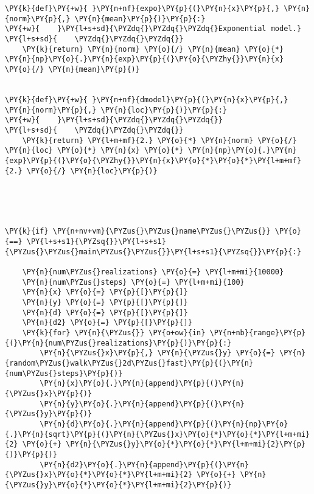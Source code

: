 \begin{Verbatim}[label=\makebox{\href{https://github.com/unipi-physics-labs/lab1-sheets/tree/main/snippy/random_walk.py}{https://github.com/.../random\_walk.py}},commandchars=\\\{\}]
\PY{k}{def}\PY{+w}{ }\PY{n+nf}{expo}\PY{p}{(}\PY{n}{x}\PY{p}{,} \PY{n}{norm}\PY{p}{,} \PY{n}{mean}\PY{p}{)}\PY{p}{:}
\PY{+w}{    }\PY{l+s+sd}{\PYZdq{}\PYZdq{}\PYZdq{}Exponential model.}
\PY{l+s+sd}{    \PYZdq{}\PYZdq{}\PYZdq{}}
    \PY{k}{return} \PY{n}{norm} \PY{o}{/} \PY{n}{mean} \PY{o}{*} \PY{n}{np}\PY{o}{.}\PY{n}{exp}\PY{p}{(}\PY{o}{\PYZhy{}}\PY{n}{x} \PY{o}{/} \PY{n}{mean}\PY{p}{)}


\PY{k}{def}\PY{+w}{ }\PY{n+nf}{dmodel}\PY{p}{(}\PY{n}{x}\PY{p}{,} \PY{n}{norm}\PY{p}{,} \PY{n}{loc}\PY{p}{)}\PY{p}{:}
\PY{+w}{    }\PY{l+s+sd}{\PYZdq{}\PYZdq{}\PYZdq{}}
\PY{l+s+sd}{    \PYZdq{}\PYZdq{}\PYZdq{}}
    \PY{k}{return} \PY{l+m+mf}{2.} \PY{o}{*} \PY{n}{norm} \PY{o}{/} \PY{n}{loc} \PY{o}{*} \PY{n}{x} \PY{o}{*} \PY{n}{np}\PY{o}{.}\PY{n}{exp}\PY{p}{(}\PY{o}{\PYZhy{}}\PY{n}{x}\PY{o}{*}\PY{o}{*}\PY{l+m+mf}{2.} \PY{o}{/} \PY{n}{loc}\PY{p}{)}





\PY{k}{if} \PY{n+nv+vm}{\PYZus{}\PYZus{}name\PYZus{}\PYZus{}} \PY{o}{==} \PY{l+s+s1}{\PYZsq{}}\PY{l+s+s1}{\PYZus{}\PYZus{}main\PYZus{}\PYZus{}}\PY{l+s+s1}{\PYZsq{}}\PY{p}{:}

    \PY{n}{num\PYZus{}realizations} \PY{o}{=} \PY{l+m+mi}{10000}
    \PY{n}{num\PYZus{}steps} \PY{o}{=} \PY{l+m+mi}{100}
    \PY{n}{x} \PY{o}{=} \PY{p}{[}\PY{p}{]}
    \PY{n}{y} \PY{o}{=} \PY{p}{[}\PY{p}{]}
    \PY{n}{d} \PY{o}{=} \PY{p}{[}\PY{p}{]}
    \PY{n}{d2} \PY{o}{=} \PY{p}{[}\PY{p}{]}
    \PY{k}{for} \PY{n}{\PYZus{}} \PY{o+ow}{in} \PY{n+nb}{range}\PY{p}{(}\PY{n}{num\PYZus{}realizations}\PY{p}{)}\PY{p}{:}
        \PY{n}{\PYZus{}x}\PY{p}{,} \PY{n}{\PYZus{}y} \PY{o}{=} \PY{n}{random\PYZus{}walk\PYZus{}2d\PYZus{}fast}\PY{p}{(}\PY{n}{num\PYZus{}steps}\PY{p}{)}
        \PY{n}{x}\PY{o}{.}\PY{n}{append}\PY{p}{(}\PY{n}{\PYZus{}x}\PY{p}{)}
        \PY{n}{y}\PY{o}{.}\PY{n}{append}\PY{p}{(}\PY{n}{\PYZus{}y}\PY{p}{)}
        \PY{n}{d}\PY{o}{.}\PY{n}{append}\PY{p}{(}\PY{n}{np}\PY{o}{.}\PY{n}{sqrt}\PY{p}{(}\PY{n}{\PYZus{}x}\PY{o}{*}\PY{o}{*}\PY{l+m+mi}{2} \PY{o}{+} \PY{n}{\PYZus{}y}\PY{o}{*}\PY{o}{*}\PY{l+m+mi}{2}\PY{p}{)}\PY{p}{)}
        \PY{n}{d2}\PY{o}{.}\PY{n}{append}\PY{p}{(}\PY{n}{\PYZus{}x}\PY{o}{*}\PY{o}{*}\PY{l+m+mi}{2} \PY{o}{+} \PY{n}{\PYZus{}y}\PY{o}{*}\PY{o}{*}\PY{l+m+mi}{2}\PY{p}{)}


\end{Verbatim}
